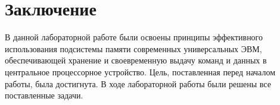 \chapter*{Заключение}

В данной лабораторной работе были освоены принципы эффективного использования подсистемы памяти современных универсальных ЭВМ, обеспечивающей хранение и своевременную выдачу команд и данных в центральное процессорное устройство. Цель, поставленная перед началом работы, была достигнута. В ходе лабораторной работы были решены все поставленные задачи.
